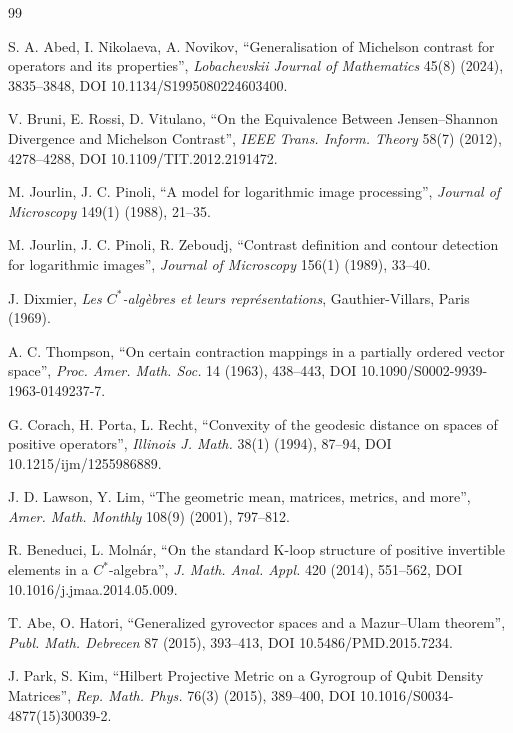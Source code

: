 \documentclass{article}
\theoremstyle{remark}
\begin{document}
\begin{thebibliography}{99}

 S. A. Abed, I. Nikolaeva, A. Novikov, ``Generalisation of Michelson contrast for operators and its properties'', \emph{Lobachevskii Journal of Mathematics} 45(8) (2024), 3835--3848, DOI 10.1134/S1995080224603400.

 V. Bruni, E. Rossi, D. Vitulano, ``On the Equivalence Between Jensen--Shannon Divergence and Michelson Contrast'', \emph{IEEE Trans. Inform. Theory} 58(7) (2012), 4278--4288, DOI 10.1109/TIT.2012.2191472.

 M. Jourlin, J. C. Pinoli, ``A model for logarithmic image processing'', \emph{Journal of Microscopy} 149(1) (1988), 21--35.

 M. Jourlin, J. C. Pinoli, R. Zeboudj, ``Contrast definition and contour detection for logarithmic images'', \emph{Journal of Microscopy} 156(1) (1989), 33--40.

 J. Dixmier, \emph{Les $C^*$-alg\`ebres et leurs repr\'esentations}, Gauthier-Villars, Paris (1969).

 A. C. Thompson, ``On certain contraction mappings in a partially ordered vector space'', \emph{Proc. Amer. Math. Soc.} 14 (1963), 438--443, DOI 10.1090/S0002-9939-1963-0149237-7.

 G. Corach, H. Porta, L. Recht, ``Convexity of the geodesic distance on spaces of positive operators'', \emph{Illinois J. Math.} 38(1) (1994), 87--94, DOI 10.1215/ijm/1255986889.

 J. D. Lawson, Y. Lim, ``The geometric mean, matrices, metrics, and more'', \emph{Amer. Math. Monthly} 108(9) (2001), 797--812.

 R. Beneduci, L. Moln\'ar, ``On the standard K-loop structure of positive invertible elements in a $C^*$-algebra'', \emph{J. Math. Anal. Appl.} 420 (2014), 551--562, DOI 10.1016/j.jmaa.2014.05.009.

 T. Abe, O. Hatori, ``Generalized gyrovector spaces and a Mazur--Ulam theorem'', \emph{Publ. Math. Debrecen} 87 (2015), 393--413, DOI 10.5486/PMD.2015.7234.

 J. Park, S. Kim, ``Hilbert Projective Metric on a Gyrogroup of Qubit Density Matrices'', \emph{Rep. Math. Phys.} 76(3) (2015), 389--400, DOI 10.1016/S0034-4877(15)30039-2.


\end{thebibliography}
\end{document}
